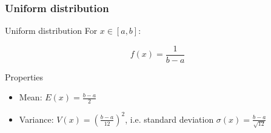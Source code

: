 \documentclass[9pt]{beamer}
\newif\ifmynote
\newcommand\mynote[1]{%
\ifmynote \textbf{#1} \else \fi
}
\begin{document}
\begin{frame}
 \frametitle{Uniform distribution}
 
 \mynote{Écrire au tableau}
 
 \begin{block}{Uniform distribution}
  For $x \in [a,b]$:
  
  $$f(x) = \frac{1}{b-a}$$
 \end{block}

 \begin{block}{Properties}
  \begin{itemize}
   \item Mean: $E(x) = \frac{b-a}{2}$
   \item Variance: $V(x) = \left(\frac{b-a}{12}\right)^2$, i.e. standard deviation $\sigma(x) = \frac{b-a}{\sqrt{12}}$
  \end{itemize}

 \end{block}

 
\end{frame}
\end{document}
